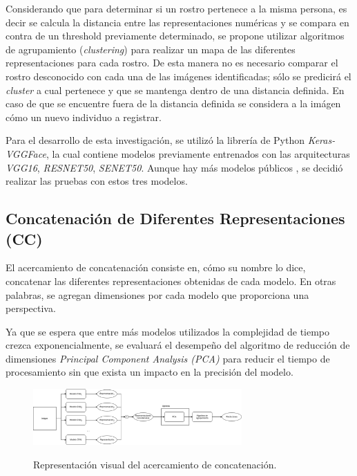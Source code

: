 \documentclass[letterpaper, 10 pt, conference]{ieeeconf}  %
\begin{document}
    Considerando que para determinar si un rostro pertenece a la misma persona, es decir se
    calcula la distancia entre las representaciones numéricas y se compara en contra de un
    threshold previamente determinado, se propone utilizar algoritmos de agrupamiento
    (\textit{clustering}) para realizar un mapa de las diferentes representaciones para cada
    rostro. De esta manera no es necesario comparar el rostro desconocido con cada una de las
    imágenes identificadas; sólo se predicirá el \textit{cluster} a cual pertenece y que se
    mantenga dentro de una distancia definida. En caso de que se encuentre fuera de la distancia
    definida se considera a la imágen cómo un nuevo individuo a registrar.

    Para el desarrollo de esta investigación, se utilizó la librería de Python
    \textit{Keras-VGGFace}, la cual contiene modelos previamente entrenados con las arquitecturas
    \textit{VGG16}, \textit{RESNET50}, \textit{SENET50}. Aunque hay más modelos públicos
    \cite{Inceptionv3}\cite{Facenet}, se decidió realizar las pruebas con estos tres modelos.

    \subsection{Concatenación de Diferentes Representaciones (CC)}
    El acercamiento de concatenación consiste en, cómo su nombre lo dice, concatenar las
    diferentes representaciones obtenidas de cada modelo. En otras palabras, se agregan dimensiones
    por cada modelo que proporciona una perspectiva.
    
    Ya que se espera que entre más modelos utilizados la complejidad de tiempo crezca
    exponencialmente, se evaluará el desempeño del algoritmo de reducción de dimensiones
    \textit{Principal Component Analysis (PCA)} para reducir el tiempo de procesamiento sin
    que exista un impacto en la precisión del modelo.

    \begin{figure}[ht]
        \centering
        \includegraphics[width=8cm]{./figs/cc.png}
        \label{fig: Concatenación}
        \caption{Representación visual del acercamiento de concatenación.}
    \end{figure}
\end{document}
